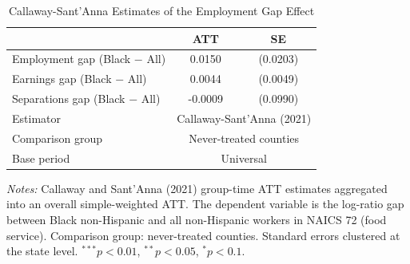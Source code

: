 \begin{table}[htbp]
\centering
\caption{Callaway-Sant'Anna Estimates of the Employment Gap Effect}
\label{tab:cs}
\begin{tabular}{lcc}
\hline\hline
 & ATT & SE \\
\hline
Employment gap (Black $-$ All) & 0.0150 & (0.0203) \\
Earnings gap (Black $-$ All) & 0.0044 & (0.0049) \\
Separations gap (Black $-$ All) & -0.0009 & (0.0990) \\
\hline
Estimator & \multicolumn{2}{c}{Callaway-Sant'Anna (2021)} \\
Comparison group & \multicolumn{2}{c}{Never-treated counties} \\
Base period & \multicolumn{2}{c}{Universal} \\
\hline\hline
\end{tabular}
\begin{tablenotes}
\small
\item \textit{Notes:} Callaway and Sant'Anna (2021) group-time ATT estimates aggregated into an 
overall simple-weighted ATT. The dependent variable is the log-ratio gap between Black non-Hispanic 
and all non-Hispanic workers in NAICS 72 (food service). Comparison group: never-treated counties. 
Standard errors clustered at the state level.
 $^{***}p<0.01$, $^{**}p<0.05$, $^{*}p<0.1$.
\end{tablenotes}
\end{table}
